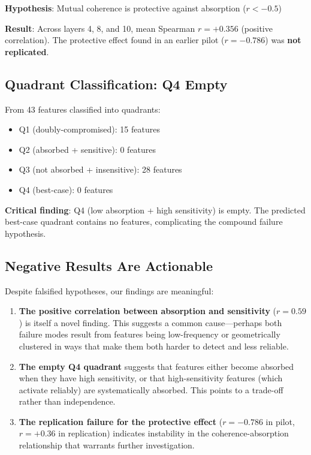 \documentclass{article}
\begin{document}
\textbf{Hypothesis}: Mutual coherence is protective against absorption ($r < -0.5$)

\textbf{Result}: Across layers 4, 8, and 10, mean Spearman $r = +0.356$ (positive correlation). The protective effect found in an earlier pilot ($r = -0.786$) was \textbf{not replicated}.

\subsection{Quadrant Classification: Q4 Empty}

From 43 features classified into quadrants:
\begin{itemize}
  \item Q1 (doubly-compromised): 15 features
  \item Q2 (absorbed + sensitive): 0 features
  \item Q3 (not absorbed + insensitive): 28 features
  \item Q4 (best-case): 0 features
\end{itemize}

\textbf{Critical finding}: Q4 (low absorption + high sensitivity) is empty. The predicted best-case quadrant contains no features, complicating the compound failure hypothesis.

\subsection{Negative Results Are Actionable}

Despite falsified hypotheses, our findings are meaningful:

\begin{enumerate}
  \item \textbf{The positive correlation between absorption and sensitivity} ($r = 0.59$) is itself a novel finding. This suggests a common cause---perhaps both failure modes result from features being low-frequency or geometrically clustered in ways that make them both harder to detect and less reliable.
  \item \textbf{The empty Q4 quadrant} suggests that features either become absorbed when they have high sensitivity, or that high-sensitivity features (which activate reliably) are systematically absorbed. This points to a trade-off rather than independence.
  \item \textbf{The replication failure for the protective effect} ($r = -0.786$ in pilot, $r = +0.36$ in replication) indicates instability in the coherence-absorption relationship that warrants further investigation.
\end{enumerate}
\end{document}
